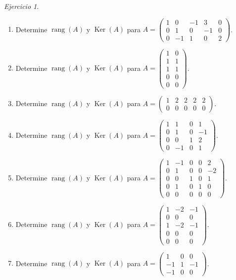 \documentclass[12pt]{article}
\theoremstyle{remark}
\newtheorem{Ejer}[definicion]{Ejercicio}
\newcommand{\rang}{\operatorname{rang}}
\newcommand{\Ker}{\operatorname{Ker}}
\begin{document}
\begin{Ejer}
\begin{enumerate}[start=213]
\item Determine $\rang(A)$ y $\Ker(A)$ para $A=\begin{pmatrix}1&0&-1&3&0\\0&1&0&-1&0\\0&-1&1&0&2\end{pmatrix}$.

\item Determine $\rang(A)$ y $\Ker(A)$ para $A=\begin{pmatrix}1&0\\1&1\\1&1\\0&0\\0&0\end{pmatrix}$.

\item Determine $\rang(A)$ y $\Ker(A)$ para $A=\begin{pmatrix}1&2&2&2&2\\0&0&0&0&0\end{pmatrix}$.

\item Determine $\rang(A)$ y $\Ker(A)$ para $A=\begin{pmatrix}1&1&0&1\\0&1&0&-1\\0&0&1&2\\0&-1&0&1\end{pmatrix}$.

\item Determine $\rang(A)$ y $\Ker(A)$ para $A=\begin{pmatrix}1&-1&0&0&2\\0&1&0&0&-2\\0&0&1&0&1\\0&1&0&1&0\\0&0&0&0&0\end{pmatrix}$.

\item Determine $\rang(A)$ y $\Ker(A)$ para $A=\begin{pmatrix}1&-2&-1\\0&0&0\\1&-2&-1\\0&0&0\\0&0&0\end{pmatrix}$.

\item Determine $\rang(A)$ y $\Ker(A)$ para $A=\begin{pmatrix}1&0&0\\-1&1&-1\\-1&0&0\end{pmatrix}$.


\end{enumerate}
\end{Ejer}
\end{document}
